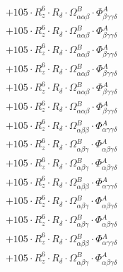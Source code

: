\documentclass{article}
\begin{document}
\begin{subequations}
\begin{gather}
\begin{array}{c}
 \\[0.2em] 		 + 105 \cdot R_{z}^{6} \cdot R_{\delta{}} \cdot \Omega{}^{B}_{\alpha{}\alpha{}\beta{}} \cdot \Phi{}^{A}_{\beta{}\gamma{}\gamma{}\delta{}} 
 \\[0.2em] 		 + 105 \cdot R_{z}^{6} \cdot R_{\delta{}} \cdot \Omega{}^{B}_{\alpha{}\alpha{}\beta{}} \cdot \Phi{}^{A}_{\beta{}\gamma{}\gamma{}\delta{}} 
 \\[0.2em] 		 + 105 \cdot R_{z}^{6} \cdot R_{\delta{}} \cdot \Omega{}^{B}_{\alpha{}\alpha{}\beta{}} \cdot \Phi{}^{A}_{\beta{}\gamma{}\gamma{}\delta{}} 
 \\[0.2em] 		 + 105 \cdot R_{z}^{6} \cdot R_{\delta{}} \cdot \Omega{}^{B}_{\alpha{}\alpha{}\beta{}} \cdot \Phi{}^{A}_{\beta{}\gamma{}\gamma{}\delta{}} 
 \\[0.2em] 		 + 105 \cdot R_{z}^{6} \cdot R_{\delta{}} \cdot \Omega{}^{B}_{\alpha{}\alpha{}\beta{}} \cdot \Phi{}^{A}_{\beta{}\gamma{}\gamma{}\delta{}} 
 \\[0.2em] 		 + 105 \cdot R_{z}^{6} \cdot R_{\delta{}} \cdot \Omega{}^{B}_{\alpha{}\alpha{}\beta{}} \cdot \Phi{}^{A}_{\beta{}\gamma{}\gamma{}\delta{}} 
 \\[0.2em] 		 + 105 \cdot R_{z}^{6} \cdot R_{\delta{}} \cdot \Omega{}^{B}_{\alpha{}\beta{}\beta{}} \cdot \Phi{}^{A}_{\alpha{}\gamma{}\gamma{}\delta{}} 
 \\[0.2em] 		 + 105 \cdot R_{z}^{6} \cdot R_{\delta{}} \cdot \Omega{}^{B}_{\alpha{}\beta{}\gamma{}} \cdot \Phi{}^{A}_{\alpha{}\beta{}\gamma{}\delta{}} 
 \\[0.2em] 		 + 105 \cdot R_{z}^{6} \cdot R_{\delta{}} \cdot \Omega{}^{B}_{\alpha{}\beta{}\gamma{}} \cdot \Phi{}^{A}_{\alpha{}\beta{}\gamma{}\delta{}} 
 \\[0.2em] 		 + 105 \cdot R_{z}^{6} \cdot R_{\delta{}} \cdot \Omega{}^{B}_{\alpha{}\beta{}\beta{}} \cdot \Phi{}^{A}_{\alpha{}\gamma{}\gamma{}\delta{}} 
 \\[0.2em] 		 + 105 \cdot R_{z}^{6} \cdot R_{\delta{}} \cdot \Omega{}^{B}_{\alpha{}\beta{}\gamma{}} \cdot \Phi{}^{A}_{\alpha{}\beta{}\gamma{}\delta{}} 
 \\[0.2em] 		 + 105 \cdot R_{z}^{6} \cdot R_{\delta{}} \cdot \Omega{}^{B}_{\alpha{}\beta{}\gamma{}} \cdot \Phi{}^{A}_{\alpha{}\beta{}\gamma{}\delta{}} 
 \\[0.2em] 		 + 105 \cdot R_{z}^{6} \cdot R_{\delta{}} \cdot \Omega{}^{B}_{\alpha{}\beta{}\beta{}} \cdot \Phi{}^{A}_{\alpha{}\gamma{}\gamma{}\delta{}} 
 \\[0.2em] 		 + 105 \cdot R_{z}^{6} \cdot R_{\delta{}} \cdot \Omega{}^{B}_{\alpha{}\beta{}\gamma{}} \cdot \Phi{}^{A}_{\alpha{}\beta{}\gamma{}\delta{}} 

\end{array}
\end{gather}
\end{subequations}
\end{document}

